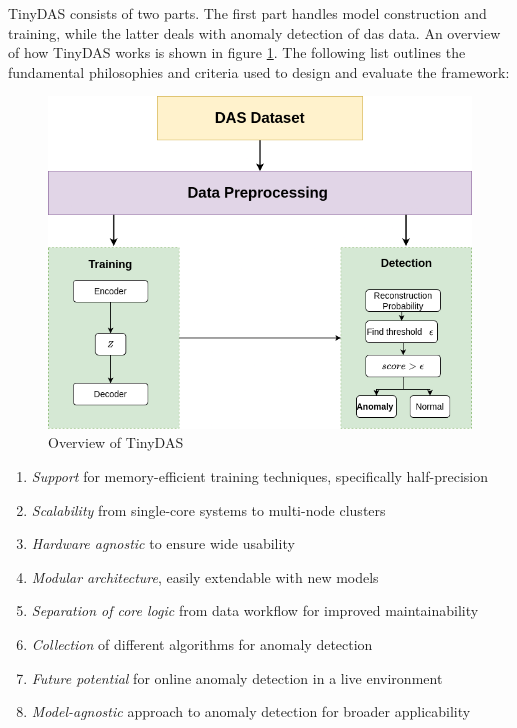 TinyDAS consists of two parts. The first part handles model construction and training, while the latter deals with anomaly detection of \acrshort{das} data. An overview of how TinyDAS works is shown in figure \ref{fig:dataflow}. The following list outlines the fundamental philosophies and criteria used to design and evaluate the framework:

\begin{figure}[!h]
    \centering
    \includegraphics[scale=0.5]{figures/methodflow.png}
    \caption{Overview of TinyDAS}
    \label{fig:dataflow}
\end{figure}


\begin{enumerate}
    \item \textit{Support} for memory-efficient training techniques, specifically half-precision
    \item \textit{Scalability} from single-core systems to multi-node clusters
    \item \textit{Hardware agnostic} to ensure wide usability
    \item \textit{Modular architecture}, easily extendable with new models
    \item \textit{Separation of core logic} from data workflow for improved maintainability
    \item \textit{Collection} of different algorithms for anomaly detection
    \item \textit{Future potential} for online anomaly detection in a live environment
    \item \textit{Model-agnostic} approach to anomaly detection for broader applicability
\end{enumerate}

